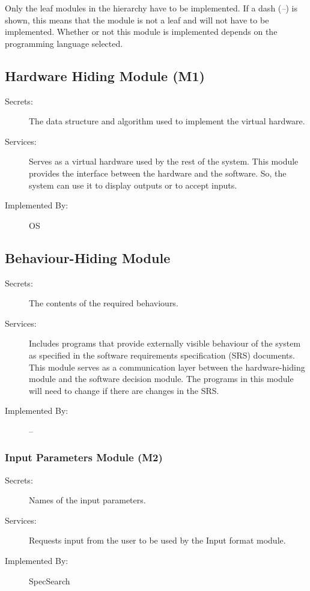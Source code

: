 \documentclass[12pt, titlepage]{article}
\begin{document}
Only the leaf modules in the
hierarchy have to be implemented. If a dash (\emph{--}) is shown, this means
that the module is not a leaf and will not have to be implemented. Whether or
not this module is implemented depends on the programming language
selected.

\subsection{Hardware Hiding Module (M1)}

\begin{description}
\item[Secrets:]The data structure and algorithm used to implement the virtual
  hardware.
\item[Services:]Serves as a virtual hardware used by the rest of the
  system. This module provides the interface between the hardware and the
  software. So, the system can use it to display outputs or to accept inputs.
\item[Implemented By:] OS
\end{description}

\subsection{Behaviour-Hiding Module }

\begin{description}
\item[Secrets:]The contents of the required behaviours.
\item[Services:]Includes programs that provide externally visible behaviour of
  the system as specified in the software requirements specification (SRS)
  documents. This module serves as a communication layer between the
  hardware-hiding module and the software decision module. The programs in this
  module will need to change if there are changes in the SRS.
\item[Implemented By:] --
\end{description}

\subsubsection{Input Parameters Module (M2)}

\begin{description}
	\item[Secrets:]Names of the input parameters. 
	\item[Services:]Requests input from the user to be used by the Input format 
	module. 
	\item[Implemented By:]SpecSearch 
\end{description} 
\end{document}
